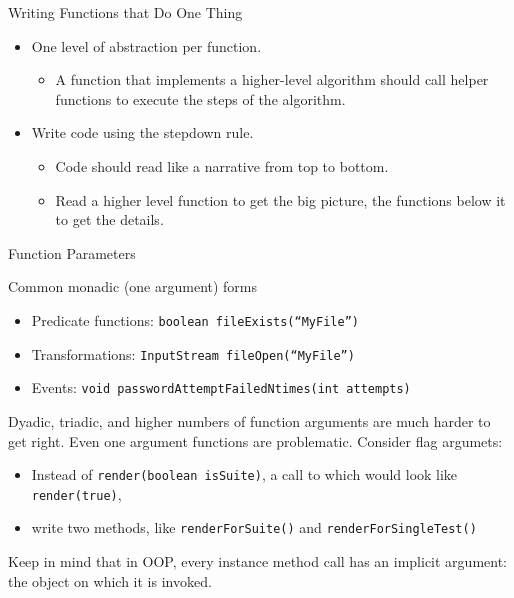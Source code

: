 \documentclass{beamer}
\begin{document}
\begin{frame}[fragile]{Writing Functions that Do One Thing}


\begin{itemize}
\item One level of abstraction per function.
\begin{itemize}
\item A function that implements a higher-level algorithm should call helper functions to execute the steps of the algorithm.
\end{itemize}
\item Write code using the stepdown rule.
\begin{itemize}
\item Code should read like a narrative from top to bottom.
\item Read a higher level function to get the big picture, the functions below it to get the details.
\end{itemize}

\end{itemize}


\end{frame}

\begin{frame}[fragile]{Function Parameters}


Common monadic (one argument) forms
\begin{itemize}
\item Predicate functions: {\tt boolean fileExists(``MyFile'')}
\item Transformations: {\tt InputStream fileOpen(``MyFile'')}
\item Events: {\tt void passwordAttemptFailedNtimes(int attempts)}
\end{itemize}

Dyadic, triadic, and higher numbers of function arguments are much harder to get right.  Even one argument functions are problematic.  Consider flag argumets:
\begin{itemize}
\item Instead of {\tt render(boolean isSuite)}, a call to which would look like {\tt render(true)}, 
\item write two methods, like {\tt renderForSuite()} and {\tt renderForSingleTest()}
\end{itemize}

Keep in mind that in OOP, every instance method call has an implicit argument: the object on which it is invoked.
\end{frame}
\end{document}
